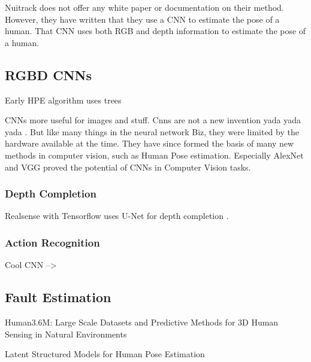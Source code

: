 \cite{RGBDHPEforRoboticTaskLearning}

Nuitrack does not offer any white paper or documentation on their method. However, they have written that they use a CNN to estimate the pose of a human. That CNN uses both RGB and depth information to estimate the pose of a human.


\subsection{RGBD CNNs}

Early HPE algorithm uses trees \cite{EarlyRGBDHPE}

CNNs more useful for images and stuff. Cnns are not a new invention yada yada yada \cite{OldCNN}. But like many things in the neural network Biz, they were limited by the hardware available at the time. They have since formed the basis of many new methods in computer vision, such as Human Pose estimation. Especially AlexNet \cite{AlexNet} and VGG \cite{VGG} proved the potential of CNNs in Computer Vision tasks. 

\subsubsection{Depth Completion}

Realsense with Tensorflow \cite{TensorflowRealsense} uses U-Net for depth completion \cite{UNET}.

\subsubsection{Action Recognition}

Cool CNN --> \cite{ElboushakiAbdessamad2020MAmf}

\subsection{Fault Estimation}

Human3.6M: Large Scale Datasets and Predictive Methods for 3D Human Sensing in Natural Environments \cite{h36m_pami}


Latent Structured Models for Human Pose Estimation \cite{IonescuSminchisescu11} 
